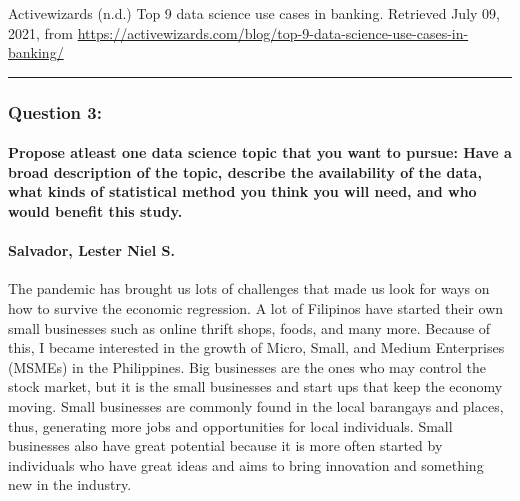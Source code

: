 \documentclass[
]{article}
\begin{document}
Activewizards (n.d.) Top 9 data science use cases in banking. Retrieved
July 09, 2021, from
\url{https://activewizards.com/blog/top-9-data-science-use-cases-in-banking/}

\begin{center}\rule{0.5\linewidth}{0.5pt}\end{center}

\hypertarget{question-3}{%
\subsubsection{\texorpdfstring{\textbf{Question
3:}}{Question 3:}}\label{question-3}}

\hypertarget{propose-atleast-one-data-science-topic-that-you-want-to-pursue-have-a-broad-description-of-the-topic-describe-the-availability-of-the-data-what-kinds-of-statistical-method-you-think-you-will-need-and-who-would-benefit-this-study.}{%
\paragraph{Propose atleast one data science topic that you want to
pursue: Have a broad description of the topic, describe the availability
of the data, what kinds of statistical method you think you will need,
and who would benefit this
study.}\label{propose-atleast-one-data-science-topic-that-you-want-to-pursue-have-a-broad-description-of-the-topic-describe-the-availability-of-the-data-what-kinds-of-statistical-method-you-think-you-will-need-and-who-would-benefit-this-study.}}

\hypertarget{salvador-lester-niel-s.}{%
\paragraph{Salvador, Lester Niel S.}\label{salvador-lester-niel-s.}}

The pandemic has brought us lots of challenges that made us look for
ways on how to survive the economic regression. A lot of Filipinos have
started their own small businesses such as online thrift shops, foods,
and many more. Because of this, I became interested in the growth of
Micro, Small, and Medium Enterprises (MSMEs) in the Philippines. Big
businesses are the ones who may control the stock market, but it is the
small businesses and start ups that keep the economy moving. Small
businesses are commonly found in the local barangays and places, thus,
generating more jobs and opportunities for local individuals. Small
businesses also have great potential because it is more often started by
individuals who have great ideas and aims to bring innovation and
something new in the industry.
\end{document}
